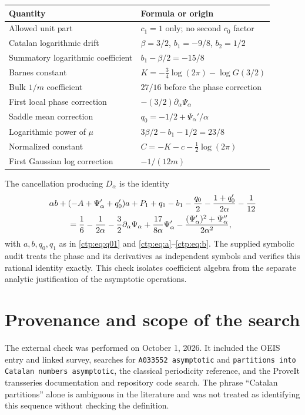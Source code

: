 \documentclass[11pt,a4paper]{article}
\numberwithin{equation}{section}
\theoremstyle{definition}
\theoremstyle{remark}
\begin{document}
\begin{center}
\begin{tabular}{ll}
\toprule
Quantity & Formula or origin\\
\midrule
Allowed unit part & $c_1=1$ only; no second $c_0$ factor\\
Catalan logarithmic drift & $\beta=3/2$, $b_1=-9/8$, $b_2=1/2$\\
Summatory logarithmic coefficient & $b_1-\beta/2=-15/8$\\
Barnes constant & $K=-\tfrac34\log(2\pi)-\log G(3/2)$\\
Bulk $1/m$ coefficient & $27/16$ before the phase correction\\
First local phase correction & $-(3/2)\partial_\alpha\Psi_\alpha$\\
Saddle mean correction & $q_0=-1/2+\Psi_\alpha'/\alpha$\\
Logarithmic power of $\mu$ & $3\beta/2-b_1-1/2=23/8$\\
Normalized constant & $C=-K-c-\tfrac12\log(2\pi)$\\
First Gaussian log correction & $-1/(12m)$\\
\bottomrule
\end{tabular}
\end{center}

The cancellation producing $D_\alpha$ is the identity
\begin{align*}
 &\alpha b+(-A+\Psi_\alpha'+q_0')a+
 P_1+q_1-b_1-\frac{q_0}{2}-\frac{1+q_0'}{2\alpha}-\frac1{12}\\
 &\hspace{8mm}=\frac16-\frac1{2\alpha}
 -\frac32\partial_\alpha\Psi_\alpha
 +\frac{17}{8\alpha}\Psi_\alpha'
 -\frac{(\Psi_\alpha')^2+\Psi_\alpha''}{2\alpha^2},
\end{align*}
with $a,b,q_0,q_1$ as in \eqref{ctp:eq:q01} and
\eqref{ctp:eq:a}--\eqref{ctp:eq:b}. The supplied symbolic audit treats the phase
and its derivatives as independent symbols and verifies this rational
identity exactly. This check isolates coefficient algebra from the
separate analytic justification of the asymptotic operations.

\section{Provenance and scope of the search}
\label{ctp:app:provenance}
The external check was performed on October 1, 2026. It included the OEIS
entry and linked survey, searches for \texttt{A033552 asymptotic} and
\texttt{partitions into Catalan numbers asymptotic}, the classical
periodicity reference, and the ProveIt transseries documentation and
repository code search. The phrase ``Catalan partitions'' alone is
ambiguous in the literature and was not treated as identifying this
sequence without checking the definition.
\end{document}
